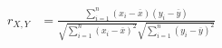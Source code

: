 \documentclass[border=2pt, varwidth=3in]{standalone}
\begin{document}
\color{fg}

\begin{align*}
r_{X, Y} &= \frac{
\sum_{i=1}^n(x_i - \overline{x})(y_i - \overline{y})
}{
\sqrt{
\sum_{i=1}^n(x_i-\overline{x})^2
}
\sqrt{
\sum_{i=1}^n(y_i-\overline{y})^2
}
}
\end{align*}
\end{document}
